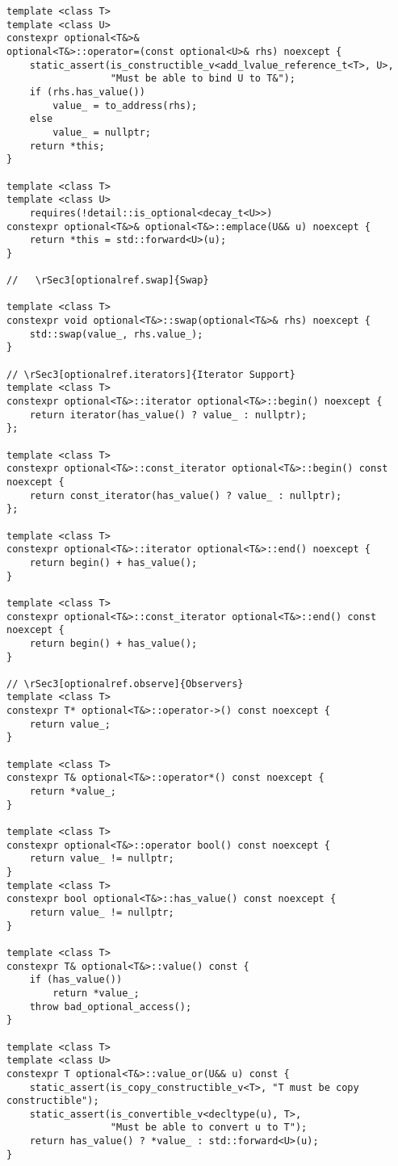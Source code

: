 \documentclass[a4paper,10pt,oneside,openany,final,article]{memoir}
\begin{document}
\begin{verbatim}
template <class T>
template <class U>
constexpr optional<T&>&
optional<T&>::operator=(const optional<U>& rhs) noexcept {
    static_assert(is_constructible_v<add_lvalue_reference_t<T>, U>,
                  "Must be able to bind U to T&");
    if (rhs.has_value())
        value_ = to_address(rhs);
    else
        value_ = nullptr;
    return *this;
}

template <class T>
template <class U>
    requires(!detail::is_optional<decay_t<U>>)
constexpr optional<T&>& optional<T&>::emplace(U&& u) noexcept {
    return *this = std::forward<U>(u);
}

//   \rSec3[optionalref.swap]{Swap}

template <class T>
constexpr void optional<T&>::swap(optional<T&>& rhs) noexcept {
    std::swap(value_, rhs.value_);
}

// \rSec3[optionalref.iterators]{Iterator Support}
template <class T>
constexpr optional<T&>::iterator optional<T&>::begin() noexcept {
    return iterator(has_value() ? value_ : nullptr);
};

template <class T>
constexpr optional<T&>::const_iterator optional<T&>::begin() const noexcept {
    return const_iterator(has_value() ? value_ : nullptr);
};

template <class T>
constexpr optional<T&>::iterator optional<T&>::end() noexcept {
    return begin() + has_value();
}

template <class T>
constexpr optional<T&>::const_iterator optional<T&>::end() const noexcept {
    return begin() + has_value();
}

// \rSec3[optionalref.observe]{Observers}
template <class T>
constexpr T* optional<T&>::operator->() const noexcept {
    return value_;
}

template <class T>
constexpr T& optional<T&>::operator*() const noexcept {
    return *value_;
}

template <class T>
constexpr optional<T&>::operator bool() const noexcept {
    return value_ != nullptr;
}
template <class T>
constexpr bool optional<T&>::has_value() const noexcept {
    return value_ != nullptr;
}

template <class T>
constexpr T& optional<T&>::value() const {
    if (has_value())
        return *value_;
    throw bad_optional_access();
}

template <class T>
template <class U>
constexpr T optional<T&>::value_or(U&& u) const {
    static_assert(is_copy_constructible_v<T>, "T must be copy constructible");
    static_assert(is_convertible_v<decltype(u), T>,
                  "Must be able to convert u to T");
    return has_value() ? *value_ : std::forward<U>(u);
}


\end{verbatim}
\end{document}
